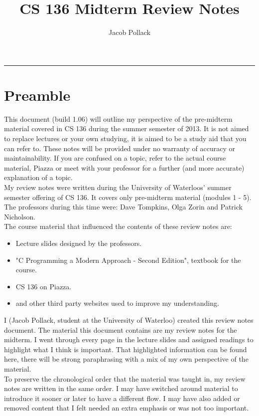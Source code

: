 \documentclass[12pt,extarticle]{article}
\title{\textbf{CS 136 Midterm Review Notes}}
\author{Jacob Pollack}
\date{}
\newcommand{\docauthor}{Jacob Pollack}
\newcommand{\docbuild}{1.06}
\begin{document}
\thispagestyle{empty}

\makeatletter
\hfil\parbox[t]{0.7\textwidth}{\centering\LARGE\bfseries\@title}\par
\kern0.5cm \hrule\kern0.5cm
\makeatother

\section*{Preamble}
This document (build \docbuild) will outline my perspective of the pre-midterm material covered in CS 136 during the summer semester of 2013. It is not aimed to replace lectures or your own studying, it is aimed to be a study aid that you can refer to. These notes will be provided under no warranty of accuracy or maintainability. If you are confused on a topic, refer to the actual course material, Piazza or meet with your professor for a further (and more accurate) explanation of a topic.\\

My review notes were written during the University of Waterloos' summer semester offering of CS 136. It covers only pre-midterm material (modules 1 - 5). The professors during this time were: Dave Tompkins, Olga Zorin and Patrick Nicholson.\\

The course material that influenced the contents of these review notes are:

\begin{itemize}

\item Lecture slides designed by the professors.
\item "C Programming a Modern Approach - Second Edition", textbook for the course.
\item CS 136 on Piazza.
\item and other third party websites used to improve my understanding.

\end{itemize}

I ({\docauthor}, student at the University of Waterloo) created this review notes document. The material this document contains are my review notes for the midterm. I went through every page in the lecture slides and assigned readings to highlight what I think is important. That highlighted information can be found here, there will be strong paraphrasing with a mix of my own perspective of the material.\\

To preserve the chronological order that the material was taught in, my review notes are written in the same order. I may have switched around material to introduce it sooner or later to have a different flow. I may have also added or removed content that I felt needed an extra emphasis or was not too important.\\
\end{document}
